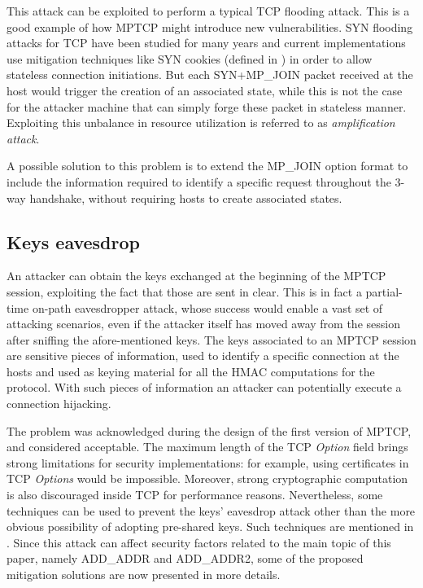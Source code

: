 This attack can be exploited to perform a typical TCP flooding attack. This is a good example of how MPTCP might introduce new vulnerabilities. 
SYN flooding attacks for TCP have been studied for many years and current implementations use mitigation techniques like SYN cookies (defined in ) in order to allow stateless connection initiations. But each SYN+MP\_JOIN packet received at the host would trigger the creation of an associated state, while this is not the case for the attacker machine that can simply forge these packet in stateless manner. Exploiting this unbalance in resource utilization is referred to as \textit{amplification attack}.

A possible solution to this problem is to extend the MP\_JOIN option format to include the information required to identify a specific request throughout the 3-way handshake, without requiring hosts to create associated states.

\subsection{Keys eavesdrop}
\label{keyseav}
An attacker can obtain the keys exchanged at the beginning of the MPTCP session, exploiting the fact that those are sent in clear. This is in fact a partial-time on-path eavesdropper attack, whose success would enable a vast set of attacking scenarios, even if the attacker itself has moved away from the session after sniffing the afore-mentioned keys.
The keys associated to an MPTCP session are sensitive pieces of information, used to identify a specific connection at the hosts and used as keying material for all the HMAC computations for the protocol. With such pieces of information an attacker can potentially execute a connection hijacking.  

The problem was acknowledged during the design of the first version of MPTCP, and considered acceptable. The maximum length of the TCP \textit{Option} field brings strong limitations for security implementations: for example, using certificates in TCP \textit{Options} would be impossible. Moreover, strong cryptographic computation is also discouraged inside TCP for performance reasons. Nevertheless, some techniques can be used to prevent the keys' eavesdrop attack other than the more obvious possibility of adopting pre-shared keys. Such techniques are mentioned in . Since this attack can affect security factors related to the main topic of this paper, namely ADD\_ADDR and ADD\_ADDR2, some of the proposed mitigation solutions are now presented in more details.

